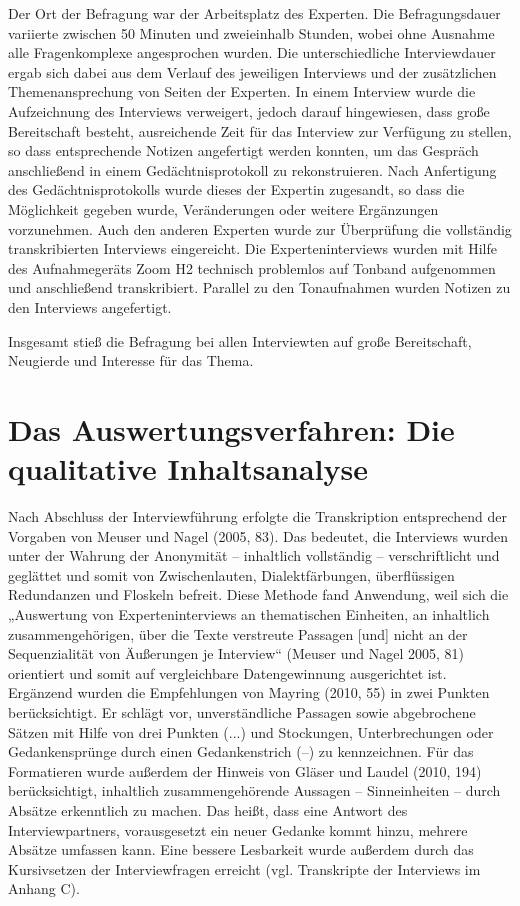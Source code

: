 Der Ort der Befragung war der Arbeitsplatz des Experten. Die Befragungsdauer variierte zwischen 50 Minuten und zweieinhalb Stunden, wobei ohne Ausnahme alle Fragenkomplexe angesprochen wurden. Die unterschiedliche Interviewdauer ergab sich dabei aus dem Verlauf des jeweiligen Interviews und der zusätzlichen Themenansprechung von Seiten der Experten. In einem Interview wurde die Aufzeichnung des Interviews verweigert, jedoch darauf hingewiesen, dass große Bereitschaft besteht, ausreichende Zeit für das Interview zur Verfügung zu stellen, so dass entsprechende Notizen angefertigt werden konnten, um das Gespräch anschließend in einem Gedächtnisprotokoll zu rekonstruieren. Nach Anfertigung des Gedächtnisprotokolls wurde dieses der Expertin zugesandt, so dass die Möglichkeit gegeben wurde, Veränderungen oder weitere Ergänzungen vorzunehmen. Auch den anderen Experten wurde zur Überprüfung die vollständig transkribierten Interviews eingereicht. 
Die Experteninterviews wurden mit Hilfe des Aufnahmegeräts Zoom H2 technisch problemlos auf Tonband aufgenommen und anschließend transkribiert. Parallel zu den Tonaufnahmen wurden Notizen zu den Interviews angefertigt. 

Insgesamt stieß die Befragung bei allen Interviewten auf große Bereitschaft, Neugierde und Interesse für das Thema.

\section{Das Auswertungsverfahren: Die qualitative Inhaltsanalyse}

Nach Abschluss der Interviewführung erfolgte die Transkription entsprechend der Vorgaben von Meuser und Nagel (2005, 83). Das bedeutet, die Interviews wurden unter der Wahrung der Anonymität -- inhaltlich vollständig -- verschriftlicht und geglättet und somit von Zwischenlauten, Dialektfärbungen, überflüssigen Redundanzen und Floskeln befreit. Diese Methode fand Anwendung, weil sich die „Auswertung von Experteninterviews an thematischen Einheiten, an inhaltlich zusammengehörigen, über die Texte verstreute Passagen [und] nicht an der Sequenzialität von Äußerungen je Interview“ (Meuser und Nagel 2005, 81) orientiert und somit auf vergleichbare Datengewinnung ausgerichtet ist. 
Ergänzend wurden die Empfehlungen von Mayring (2010, 55) in zwei Punkten berücksichtigt. Er schlägt vor, unverständliche Passagen sowie abgebrochene Sätzen mit Hilfe von drei Punkten (...) und Stockungen, Unterbrechungen oder Gedankensprünge durch einen Gedankenstrich (--) zu kennzeichnen. 
Für das Formatieren wurde außerdem der Hinweis von Gläser und Laudel (2010, 194) berücksichtigt, inhaltlich zusammengehörende Aussagen -- Sinneinheiten -- durch Absätze erkenntlich zu machen. Das heißt, dass eine Antwort des Interviewpartners, vorausgesetzt ein neuer Gedanke kommt hinzu, mehrere Absätze umfassen kann. Eine bessere Lesbarkeit wurde außerdem durch das Kursivsetzen der Interviewfragen erreicht (vgl. Transkripte der Interviews im Anhang C). 

